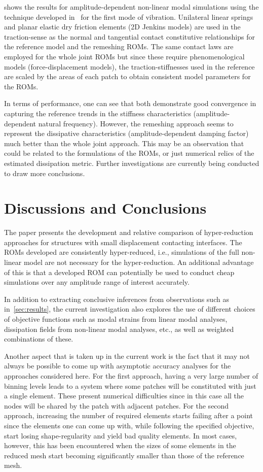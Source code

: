 \documentclass[10pt,print]{article}
\begin{document}
 shows the results for amplitude-dependent non-linear
modal simulations using the technique developed in~\cite{rqnm} for the
first mode of vibration. Unilateral linear springs and planar elastic dry
friction elements (2D Jenkins models) are used in the traction-sense
as the normal and tangential contact constitutive relationships for
the reference model and the remeshing ROMs. The same contact laws are
employed for the whole joint ROMs but since these require
phenomenological models (force-displacement models), the
traction-stiffnesses used in the reference are scaled by the areas of
each patch to obtain consistent model parameters for the ROMs.

In terms of performance, one can see that both demonstrate good
convergence in capturing the reference trends in the stiffness
characteristics (amplitude-dependent natural frequency). However, the
remeshing approach seems to represent the dissipative characteristics
(amplitude-dependent damping factor) much better than the whole joint
approach. This may be an observation that could be related to the
formulations of the ROMs, or just numerical relics of the estimated
dissipation metric. Further investigations are currently being
conducted to draw more conclusions.

\section{Discussions and Conclusions}
\label{sec:disc-concl}

The paper presents the development and relative comparison of
hyper-reduction approaches for structures with small displacement
contacting interfaces. The ROMs developed are consistently
hyper-reduced, i.e., simulations of the full non-linear model are not
necessary for the hyper-reduction. An additional advantage of this is
that a developed ROM can potentially be used to conduct cheap
simulations over any amplitude range of interest accurately.

In addition to extracting conclusive inferences from observations such
as in~\cref{sec:results}, the current investigation also explores the
use of different choices of objective functions such as modal strains
from linear modal analyses, dissipation fields from non-linear modal
analyses, etc., as well as weighted combinations of these.

Another aspect that is taken up in the current work is the fact that
it may not always be possible to come up with asymptotic accuracy
analyses for the approaches considered here. For the first approach,
having a very large number of binning levels leads to a system
where some patches will be constituted with just a single
element. These present numerical difficulties since in this case all
the nodes will be shared by the patch with adjacent patches. For the
second approach, increasing the number of required elements starts
failing after a point since the elements one can come up with, while
following the specified objective, start losing
shape-regularity and yield bad quality elements. In most cases,
  however, this has been encountered when the sizes of some elements
  in the reduced mesh start becoming significantly smaller than those
  of the reference mesh.



\end{document}
